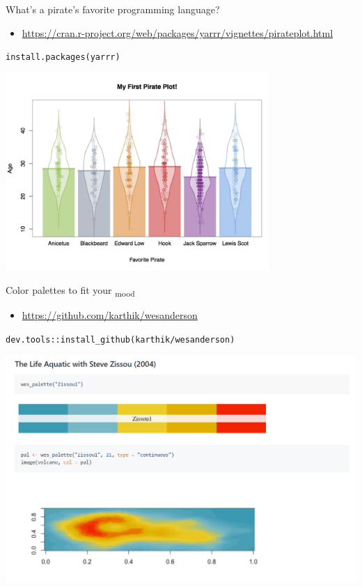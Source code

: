\documentclass[ignorenonframetext,]{beamer}
\providecommand{\tightlist}{%
  \setlength{\itemsep}{0pt}\setlength{\parskip}{0pt}}
\begin{document}
\begin{frame}[fragile]{What's a pirate's favorite programming language?}
\protect\hypertarget{whats-a-pirates-favorite-programming-language}{}

\begin{itemize}
\tightlist
\item
  \url{https://cran.r-project.org/web/packages/yarrr/vignettes/pirateplot.html}
\end{itemize}

\texttt{install.packages(\textquotesingle{}yarrr\textquotesingle{})}

\includegraphics[width=0.75\textwidth,height=\textheight]{../external/images/funR_2_pirate.png}

\end{frame}

\begin{frame}[fragile]{Color palettes to fit your \textsubscript{mood}}
\protect\hypertarget{color-palettes-to-fit-your-mood}{}

\begin{itemize}
\tightlist
\item
  \url{https://github.com/karthik/wesanderson}
\end{itemize}

\texttt{dev.tools::install\_github(karthik/wesanderson)}

\includegraphics{../external/images/funR_3_wes_anderson.png}

\end{frame}
\end{document}

